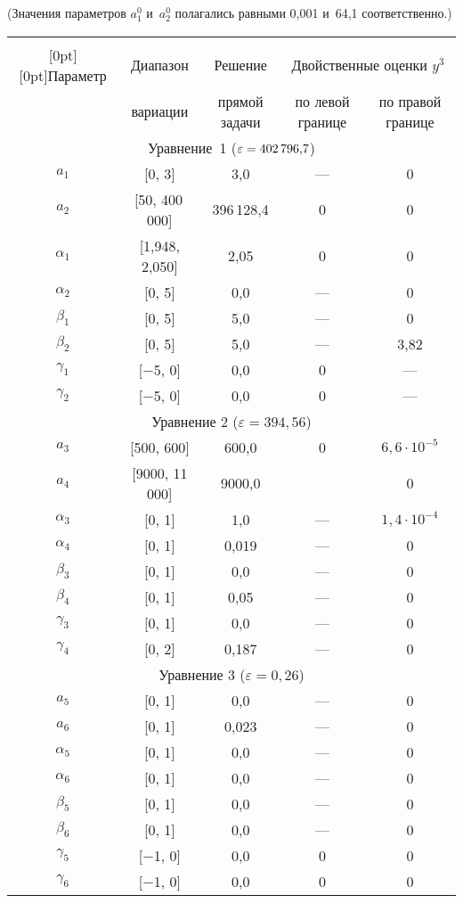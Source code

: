 \begin{multicols}{2}
  \noindent
  (Значения параметров $a_1^0$ и~$a_2^0$ полагались равными 0,001 и~64,1
соответственно.)

\begin{table*}[b]\small %
\begin{center}
\parbox{362pt}{


}

\vspace*{2ex}

\begin{tabular}{|c|c|c|c|c|}
\hline
&&&&\\[-10pt]
\multicolumn{1}{|c|}{\raisebox{-6pt}[0pt][0pt]{Параметр}}&Диапазон &
Решение &\multicolumn{2}{c|}{Двойственные
оценки
$y^3$}\\
\cline{4-5}
&вариации&прямой задачи&по левой границе&по правой границе\\
\hline
\multicolumn{5}{|c|}{Уравнение~1 ($\varepsilon\hm=402\,796{,}7$)}\\
\hline
$a_1$&[0, 3] &3,0&---&0\\
$a_2$&[50, 400\,000] &396\,128,4&0&0\\
$\alpha_1$&[1,948, 2,050] &2,05&0&0\\
$\alpha_2$&[0, 5]&0,0&---&0\\
$\beta_1$&[0, 5]&5,0&---&0\\
$\beta_2$&[0, 5]&5,0&---&3,82\\
$\gamma_1$&[$-$5, 0]&0,0&0&---\\
$\gamma_2$&[$-$5, 0]&0,0&0&---\\
\hline
\multicolumn{5}{|c|}{Уравнение 2 ($\varepsilon=394{,}56$)}\\
\hline
$a_3$&[500, 600] &600,0&0&$6{,}6\cdot 10^{-5}$\\
$a_4$&[9000, 11 000] &9000,0& &0\\
$\alpha_3$&[0, 1]&1,0&---&$1{,}4\cdot 10^{-4}$\\
$\alpha_4$&[0, 1]&0,019&---&0\\
$\beta_3$&[0, 1]&0,0&---&0\\
$\beta_4$&[0, 1]&0,05&---&0\\
$\gamma_3$&[0, 1]&0,0&---&0\\
$\gamma_4$&[0, 2]&0,187&---&0\\
\hline
\multicolumn{5}{|c|}{Уравнение 3 ($\varepsilon=0{,}26$)}\\
\hline
$a_5$&[0, 1] &0,0&---&0\\
$a_6$&[0, 1]&0,023&---&0\\
$\alpha_5$&[0, 1]&0,0&---&0\\
$\alpha_6$&[0, 1]&0,0&---&0\\
$\beta_5$&[0, 1]&0,0&---&0\\
$\beta_6$&[0, 1]&0,0&---&0\\
$\gamma_5$&[$-$1, 0]&0,0&0&0\\
$\gamma_6$&[$-$1, 0]&0,0&0&0\\
\hline
\end{tabular}
\end{center}
\end{table*}


\end{multicols}
